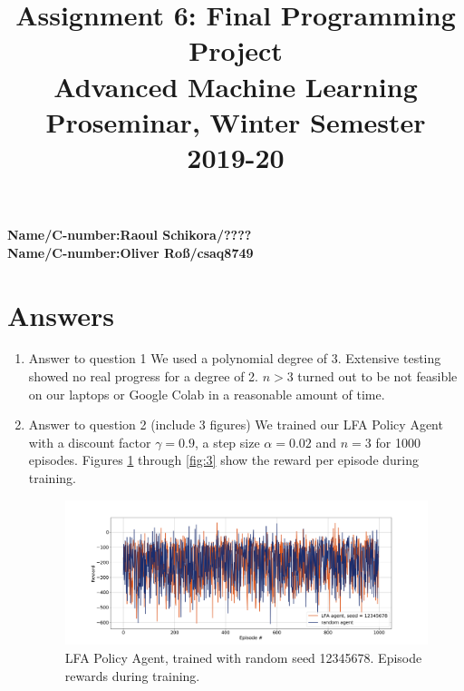 \documentclass[11pt,a4paper]{article}
\title{\textbf{Assignment 6: Final Programming Project} \\ \Large Advanced Machine Learning Proseminar, Winter Semester 2019-20}
\date{}
\begin{document}
\maketitle

\vspace{-1cm}

\noindent
\textbf{Name/C-number:Raoul Schikora/????}  \\
\textbf{Name/C-number:Oliver Roß/csaq8749}  \\

\section{Answers}

\begin{enumerate}
\item Answer to question 1
	We used a polynomial degree of 3. Extensive testing showed no real progress for a degree of 2. $n>3$ turned out to be not feasible on our laptops or Google Colab in a reasonable amount of time.
\item Answer to question 2 (include 3 figures)
	We trained our LFA Policy Agent with a discount factor $\gamma = 0.9$, a step size $\alpha = 0.02$ and $n = 3$ for 1000 episodes.
	Figures \ref{fig:1} through \ref{fig:3} show the reward per episode during training.
	\begin{figure}
	\begin{center}
		\includegraphics[width = 20cm]{12345678.png}
		\caption{LFA Policy Agent, trained with random seed 12345678. Episode rewards during training.}
		\label{fig:1}
	\end{center}
	\end{figure}


\end{enumerate}
\end{document}
